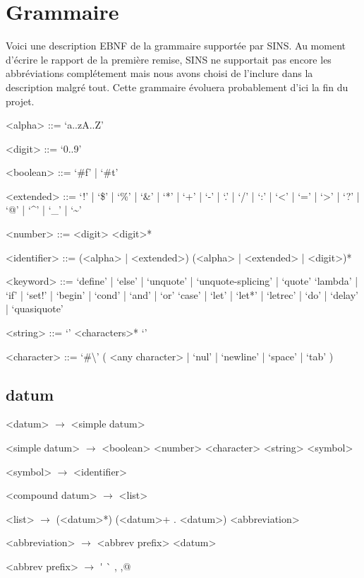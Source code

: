 \documentclass[10pt]{article}
\begin{document}
\setlength{\grammarindent}{3em}

\section*{Grammaire}
Voici une description EBNF de la grammaire supportée par SINS. Au
moment d'écrire le rapport de la première remise, SINS ne supportait
pas encore les abbréviations complétement mais nous avons choisi de
l'inclure dans la description malgré tout. Cette grammaire évoluera
probablement d'ici la fin du projet.



\begin{grammar}
  <alpha> ::= `a..zA..Z'

  <digit> ::= `0..9'

  <boolean> ::= `\#f' | `\#t'

  <extended> ::= `!' | `\$' | `\%' | `\&' | `*' | `+' | `-' | `.' | `/' | `:'
  | `<' | `=' | `>' | `?' | `@' | `\textasciicircum' | `\_' | `\textasciitilde'

  <number> ::= <digit> <digit>*

  <identifier> ::= (<alpha> | <extended>) (<alpha> | <extended> |
  <digit>)*

  <keyword> ::= `define' | `else' | `unquote' | `unquote-splicing' | `quote'
  \alt `lambda' | `if' | `set!' | `begin' | `cond' | `and' | `or'
  \alt `case' | `let' | `let*' | `letrec' | `do' | `delay' |
  `quasiquote'

  <string> ::= `\textquotedbl' <characters>* `\textquotedbl'

  <character> ::= `#\textbackslash' ( <any character> | `nul' |
  `newline' | `space' | `tab' )

\end{grammar}


\subsection*{datum}

\begin{grammar}
  <datum> $\longrightarrow$ <simple datum> 

  <simple datum> $\longrightarrow$ <boolean> \alt <number>
  \alt <character> \alt <string> \alt <symbol>

  <symbol> $\longrightarrow$ <identifier>

  <compound datum> $\longrightarrow$ <list>

  <list> $\longrightarrow$ (<datum>*) \alt (<datum>+  .  <datum>)
  \alt <abbreviation>

  <abbreviation> $\longrightarrow$ <abbrev prefix> <datum>

  <abbrev prefix> $\longrightarrow$ \'{} \alt \`{} \alt , \alt ,@

\end{grammar}
\end{document}
